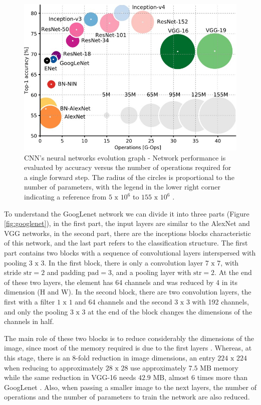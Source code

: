 \begin{figure}
    \centering
    \includegraphics[scale=0.4]{images/figure131.jpg}
    \caption{ CNN's neural networks evolution graph - Network performance is evaluated by accuracy versus the number of operations required for a single forward step. The radius of the circles is proportional to the number of parameters, with the legend in the lower right corner indicating a reference from $5\text{ x }10^6$ to $155\text{ x }10^6$ \cite{canziani2016}.}
    \label{fig:neuralevolution}
\end{figure}

To understand the GoogLenet network we can divide it into three parts (Figure \ref{fig:googlenet}), in the first part, the input layers are similar to the AlexNet and VGG networks, in the second part, there are the inceptions blocks characteristic of this network, and the last part refers to the classification structure. The first part contains two blocks with a sequence of convolutional layers interspersed with pooling $3\text{ x }3$. In the first block, there is only a convolution layer $7\text{ x }7$, with stride $\text{str} = 2$ and padding $\text{pad}= 3$, and a pooling layer with $\text{str} = 2$. At the end of these two layers, the element has 64 channels and was reduced by 4 in its dimension (H and W). In the second block, there are two convolution layers, the first with a filter $1\text{ x }1$ and 64 channels and the second $3\text{ x }3$ with 192 channels, and only the pooling $3\text{ x }3$ at the end of the block changes the dimensions of the channels in half.

The main role of these two blocks is to reduce considerably the dimensions of the image, since most of the memory required is due to the first layers \cite{johnson2019}. Whereas, at this stage, there is an 8-fold reduction in image dimensions, an entry $224\text{ x }224$ when reducing to approximately $28\text{ x }28$ use approximately $7.5 \text{ MB}$ memory while the same reduction in VGG-16 needs $42.9 \text{ MB}$, almost $6$ times more than GoogLenet \cite{johnson2019}. Also, when passing a smaller image to the next layers, the number of operations and the number of parameters to train the network are also reduced.

